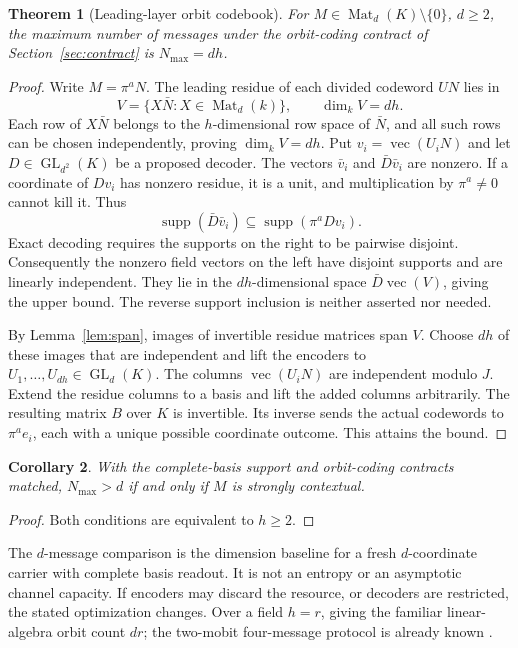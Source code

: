 \documentclass[11pt]{article}
\newtheorem{theorem}{Theorem}[section]
\newtheorem{corollary}[theorem]{Corollary}
\theoremstyle{definition}\newtheorem{definition}[theorem]{Definition}
\theoremstyle{remark}\newtheorem{remark}[theorem]{Remark}
\DeclareMathOperator{\GL}{GL}
\DeclareMathOperator{\Mat}{Mat}
\begin{document}
\begin{theorem}[Leading-layer orbit codebook]\label{thm:code}
For $M\in\Mat_d(K)\setminus\{0\}$, $d\geq2$, the maximum number of messages under the orbit-coding contract of Section~\ref{sec:contract} is $N_{\max}=dh$.
\end{theorem}
\begin{proof}
Write $M=\pi^aN$. The leading residue of each divided codeword $UN$ lies in
\[
 V=\{X\bar N:X\in\Mat_d(k)\},\qquad \dim_k V=dh.
\]
Each row of $X\bar N$ belongs to the $h$-dimensional row space of $\bar N$, and all such rows can be chosen independently, proving $\dim_kV=dh$. Put $v_i=\operatorname{vec}(U_iN)$ and let $D\in\GL_{d^2}(K)$ be a proposed decoder. The vectors $\bar v_i$ and $\bar D\bar v_i$ are nonzero. If a coordinate of $Dv_i$ has nonzero residue, it is a unit, and multiplication by $\pi^a\ne0$ cannot kill it. Thus
\[
\operatorname{supp}(\bar D\bar v_i)
\subseteq\operatorname{supp}(\pi^aDv_i).
\]
Exact decoding requires the supports on the right to be pairwise disjoint. Consequently the nonzero field vectors on the left have disjoint supports and are linearly independent. They lie in the $dh$-dimensional space $\bar D\operatorname{vec}(V)$, giving the upper bound. The reverse support inclusion is neither asserted nor needed.

By Lemma~\ref{lem:span}, images of invertible residue matrices span $V$. Choose $dh$ of these images that are independent and lift the encoders to $U_1,\ldots,U_{dh}\in\GL_d(K)$. The columns $\operatorname{vec}(U_iN)$ are independent modulo $J$. Extend the residue columns to a basis and lift the added columns arbitrarily. The resulting matrix $B$ over $K$ is invertible. Its inverse sends the actual codewords to $\pi^ae_i$, each with a unique possible coordinate outcome. This attains the bound.
\end{proof}

\begin{corollary}\label{cor:equiv}
With the complete-basis support and orbit-coding contracts matched, $N_{\max}>d$ if and only if $M$ is strongly contextual.
\end{corollary}
\begin{proof}
Both conditions are equivalent to $h\geq2$.
\end{proof}
The $d$-message comparison is the dimension baseline for a fresh $d$-coordinate carrier with complete basis readout. It is not an entropy or an asymptotic channel capacity. If encoders may discard the resource, or decoders are restricted, the stated optimization changes. Over a field $h=r$, giving the familiar linear-algebra orbit count $dr$; the two-mobit four-message protocol is already known \cite{Schumacher2010}.
\end{document}
